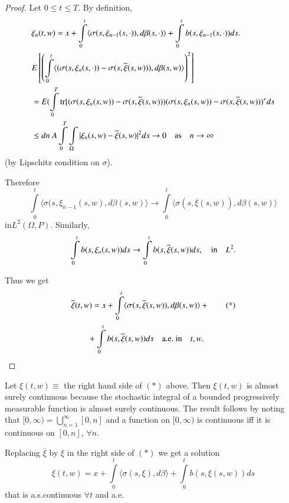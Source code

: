 \begin{proof}
Let $0\leq t\leq T$. By definition,
{\fontsize{10pt}{12pt}\selectfont
\begin{align*}
& \xi_{n}(t,w)=x+\int\limits^{t}_{0}\langle \sigma
(s,\xi_{n-1}(s,\cdot)),d\beta(s,\cdot)\rangle
+\int\limits^{t}_{0}b(s,\xi_{n-1}(s,\cdot))ds.\\ 
& E\left[\left(\int\limits^{t}_{0}\langle
  (\sigma(s,\xi_{n}(s,\cdot))-\sigma(s,\overline{\xi}(s,w))), d\beta
  (s,w)\rangle \right)^{2}\right]\\
&=E(\int\limits^{T}_{0}\tr[(\sigma(s,\xi_{n}(s,w))-\sigma(s,\overline{\xi}(s,w)))(\sigma(s,\xi_{n}(s,w))-\sigma(s,\overline{\xi}(s,w)))^{*}ds\\
&\leq
  dn\ A\int\limits^{T}_{0}\int\limits_{\Omega}|\xi_{n}(s,w)-\overline{\xi}(s,w)|^{2}ds\to
  0 \q\text{as}\q n\to \infty
\end{align*}}\relax
(by Lipschitz condition on $\sigma$).

Therefore
$$
\int\limits^{t}_{0}\langle \sigma(s,\xi_{n-1}(s,w),d\beta(s,w)\rangle
\to \int\limits^{t}_{0}\langle
\sigma(s,\overline{\xi}(s,w)),d\beta(s,w)\rangle 
$$
in\pageoriginale $L^{2}(\Omega,P)$. Similarly,
$$
\int\limits^{t}_{0}b(s,\xi_{n}(s,w))ds\to
\int\limits^{t}_{0}b(s,\overline{\xi}(s,w))ds,\quad\text{in}\quad L^{2}.
$$

Thus we get
\begin{align*}
& \overline{\xi}(t,w)=x+\int\limits^{t}_{0}\langle
\sigma(s,\overline{\xi}(s,w)),d\beta(s,w)\rangle +\tag{*}\\
&\qq +\int\limits^{t}_{0}b(s,\overline{\xi}(s,w))ds\q\text{a.e.\ in}\q t,w.
\end{align*}
\end{proof}

\begin{step}%
Let $\xi(t,w)\equiv$ the right hand side of $(*)$ above. Then
$\xi(t,w)$ is almost surely continuous because the stochastic integral
of a bounded progressively measurable function is almost surely
continuous. The result follows by noting that
$[0,\infty)=\bigcup\limits^{\infty}_{n=1}[0,n]$ and a function on
  $[0,\infty)$ is continuous iff it is continuous on $[0,n]$, $\forall n$.
\end{step}

\begin{step}%
Replacing $\overline{\xi}$ by $\xi$ in the right side of $(*)$ we get
a solution
$$
\xi(t,w)=x+\int\limits^{t}_{0}\langle \sigma(s,\xi),d\beta\rangle
+\int\limits^{t}_{0}b(s,\xi(s,w))ds 
$$
that is a.s.\@ continuous $\forall t$ and a.e.
\end{step}

